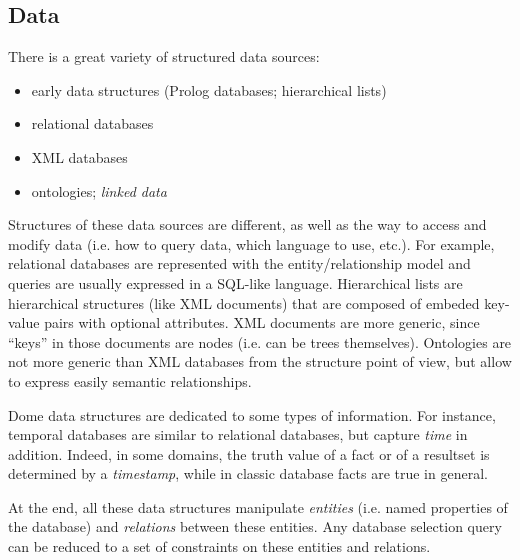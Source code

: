 \documentclass[10pt,journal,letterpaper,compsoc]{IEEEtran}
\newcommand\TODO[1]{{\textcolor{red}{TODO:#1}}}
\begin{document}
\subsection{Data}
\label{sec:data}

There is a great variety of structured data sources:
\begin{itemize}
  \item early data structures (Prolog databases; hierarchical lists)
  \item relational databases
  \item XML databases
  \item ontologies; \emph{linked data}
\end{itemize}
Structures of these data sources are different, as well as the way to access and
modify data (i.e. how to query data, which language to use, etc.).
For example, relational databases are represented with the entity/relationship
model and queries are usually expressed in a SQL-like language. Hierarchical
lists are hierarchical structures (like XML documents) that are composed of
embeded key-value pairs with optional attributes. XML documents are more
generic, since ``keys'' in those documents are nodes (i.e. can be trees
themselves). 
Ontologies are not more generic than XML databases from the structure point of
view, but allow to express easily semantic relationships.

Dome data structures are dedicated to some types of information. For instance,
temporal databases are similar to relational databases, but capture \emph{time}
in addition. Indeed, in some domains, the truth value of a fact or of
a resultset is determined by a \emph{timestamp}, while in classic database facts
are true in general. 

At the end, all these data structures manipulate \emph{entities} (i.e. named
properties of the database) and \emph{relations} between these entities.
Any database selection query can be reduced to a set of constraints on these
entities and relations. 
\end{document}
